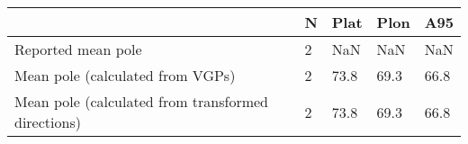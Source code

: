 \begin{tabular}{lllll}
\toprule
{} &  N &  Plat &  Plon &   A95 \\
\midrule
Reported mean pole                                 &  2 &   NaN &   NaN &   NaN \\
Mean pole (calculated from VGPs)                   &  2 &  73.8 &  69.3 &  66.8 \\
Mean pole (calculated from transformed directions) &  2 &  73.8 &  69.3 &  66.8 \\
\bottomrule
\end{tabular}
